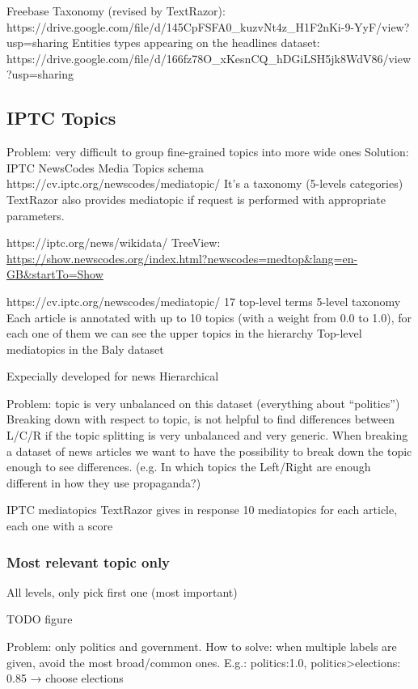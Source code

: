 Freebase Taxonomy (revised by TextRazor): https://drive.google.com/file/d/145CpFSFA0\_kuzvNt4z\_H1F2nKi-9-YyF/view?usp=sharing 
Entities types appearing on the headlines dataset: https://drive.google.com/file/d/166fz78O\_xKesnCQ\_hDGiLSH5jk8WdV86/view?usp=sharing 



\subsection{IPTC Topics}

Problem: very difficult to group fine-grained topics into more wide ones
Solution: IPTC NewsCodes Media Topics schema https://cv.iptc.org/newscodes/mediatopic/
It’s a taxonomy (5-levels categories)
TextRazor also provides mediatopic if request is performed with appropriate parameters.

https://iptc.org/news/wikidata/ 
TreeView: \url{https://show.newscodes.org/index.html?newscodes=medtop&lang=en-GB&startTo=Show}

https://cv.iptc.org/newscodes/mediatopic/
17 top-level terms
5-level taxonomy
Each article is annotated with up to 10 topics (with a weight from 0.0 to 1.0), for each one of them we can see the upper topics in the hierarchy
Top-level mediatopics in the Baly dataset


Expecially developed for news
Hierarchical


Problem: topic is very unbalanced on this dataset (everything about “politics”)
Breaking down with respect to topic, is not helpful to find differences between L/C/R if the topic splitting is very unbalanced and very generic.
When breaking a dataset of news articles we want to have the possibility to break down the topic enough to see differences. (e.g. In which topics the Left/Right are enough different in how they use propaganda?)



IPTC mediatopics
TextRazor gives in response 10 mediatopics for each article, each one with a score

\subsubsection{Most relevant topic only}
All levels, only pick first one (most important)

TODO figure


Problem: only politics and government.
How to solve: when multiple labels are given, avoid the most broad/common ones. E.g.: politics:1.0, politics>elections: 0.85 → choose elections

